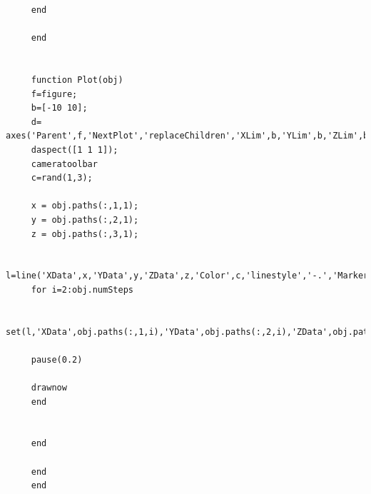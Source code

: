 \documentclass{article}
\begin{document}
\begin{lstlisting}
	 end
	 
	 end
	 
	 
	 function Plot(obj)
	 f=figure;
	 b=[-10 10];
	 d= axes('Parent',f,'NextPlot','replaceChildren','XLim',b,'YLim',b,'ZLim',b);
	 daspect([1 1 1]);
	 cameratoolbar
	 c=rand(1,3);
	 
	 x = obj.paths(:,1,1);
	 y = obj.paths(:,2,1);
	 z = obj.paths(:,3,1);
	 
	 l=line('XData',x,'YData',y,'ZData',z,'Color',c,'linestyle','-.','Marker','o','markersize',10,'Parent',d);
	 for i=2:obj.numSteps
	 
	 set(l,'XData',obj.paths(:,1,i),'YData',obj.paths(:,2,i),'ZData',obj.paths(:,3,i));
	 
	 pause(0.2)
	 
	 drawnow
	 end
	 
	 
	 end
	 
	 end
	 end
	 \end{lstlisting}
\end{document}
